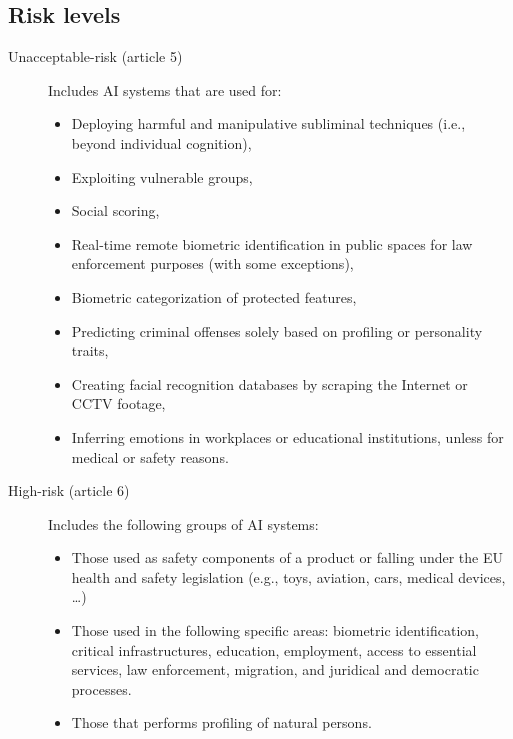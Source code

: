 \subsection{Risk levels}

\begin{description}
    \item[Unacceptable-risk (article 5)] 
        Includes AI systems that are used for:
        \begin{itemize}
            \item Deploying harmful and manipulative subliminal techniques (i.e., beyond individual cognition),
            \item Exploiting vulnerable groups,
            \item Social scoring,
            \item Real-time remote biometric identification in public spaces for law enforcement purposes (with some exceptions),
            \item Biometric categorization of protected features,
            \item Predicting criminal offenses solely based on profiling or personality traits,
            \item Creating facial recognition databases by scraping the Internet or CCTV footage,
            \item Inferring emotions in workplaces or educational institutions, unless for medical or safety reasons.
        \end{itemize}

    \item[High-risk (article 6)] 
        Includes the following groups of AI systems:
        \begin{itemize}
            \item Those used as safety components of a product or falling under the EU health and safety legislation (e.g., toys, aviation, cars, medical devices, \dots)
            \item Those used in the following specific areas: biometric identification, critical infrastructures, education, employment, access to essential services, law enforcement, migration, and juridical and democratic processes.
            \item Those that performs profiling of natural persons.
        \end{itemize}


\end{description}
